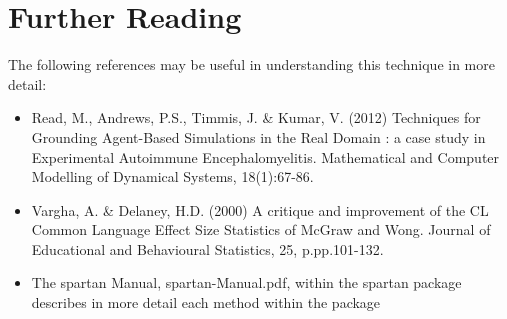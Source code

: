 \documentclass[a4paper,11pt]{article}
\begin{document}
\section{Further Reading}
\noindent
The following references may be useful in understanding this technique in more detail:
\begin{itemize}
\item Read, M., Andrews, P.S., Timmis, J. \& Kumar, V. (2012) Techniques for Grounding Agent-Based Simulations in the Real Domain : a case study in Experimental Autoimmune Encephalomyelitis. Mathematical and Computer Modelling of Dynamical Systems, 18(1):67-86.
\item Vargha, A. \& Delaney, H.D. (2000) A critique and improvement of the CL Common Language Effect Size Statistics of McGraw and Wong. Journal of Educational and Behavioural Statistics, 25, p.pp.101-132.
\item The spartan Manual, spartan-Manual.pdf, within the spartan package describes in more detail each method within the package
\end{itemize}
\end{document}
